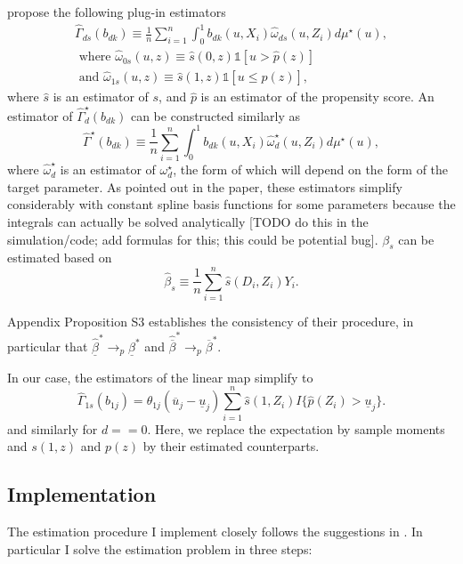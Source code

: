\documentclass[11pt, a4paper, leqno]{article}
\begin{document}
\citet{mogstad2018using} propose the following plug-in estimators
$$
\begin{gathered}
\hat{\Gamma}_{d s}\left(b_{d k}\right) \equiv \frac{1}{n} \sum_{i=1}^n \int_0^1 b_{d k}\left(u, X_i\right) \hat{\omega}_{d s}\left(u, Z_i\right) d \mu^{\star}(u), \\
\text { where } \hat{\omega}_{0 s}(u, z) \equiv \hat{s}(0, z) \mathbb{1}[u>\hat{p}(z)] \\
\text { and } \hat{\omega}_{1 s}(u, z) \equiv \hat{s}(1, z) \mathbb{1}[u \leq \hat{p}(z)],
\end{gathered}
$$
where $\hat{s}$ is an estimator of $s$, and $\hat{p}$ is an estimator of the propensity score. An estimator of $\hat{\Gamma}_d^{\star}\left(b_{d k}\right)$ can be constructed similarly as
$$
\hat{\Gamma}^{\star}\left(b_{d k}\right) \equiv \frac{1}{n} \sum_{i=1}^n \int_0^1 b_{d k}\left(u, X_i\right) \hat{\omega}_d^{\star}\left(u, Z_i\right) d \mu^{\star}(u),
$$
where $\hat{\omega}_d^{\star}$ is an estimator of $\omega_d^{\star}$, the form of which will depend on the form of the target parameter.
As pointed out in the paper, these estimators simplify considerably with constant spline basis functions for some parameters because the integrals can actually be solved analytically [TODO do this in the simulation/code; add formulas for this; this could be potential bug].
$\beta_s$ can be estimated based on
$$
\hat{\beta}_s \equiv \frac{1}{n} \sum_{i=1}^n \hat{s}\left(D_i, Z_i\right) Y_i.
$$

Appendix Proposition S3 establishes the consistency of their procedure, in particular that $\hat{\underline{\beta}}^*\to_p \underline{\beta}^*$ and $\hat{\overline{\beta}}^*\to_p\overline{\beta}^*$.

In our case, the estimators of the linear map simplify to
\begin{equation}
    \label{eq:est_weights_maps}
    \hat{\Gamma}_{1s}(b_{1j}) =\theta_{1j} (\overline{u}_j-\underline{u}_j)\sum_{i=1}^{n} \hat{s}(1,Z_i) I\{\hat{p}(Z_i)> \underline{u}_j\}.
\end{equation}
and similarly for $d==0$. Here, we replace the expectation by sample moments and $s(1,z)$ and $p(z)$ by their estimated counterparts.

\subsection{Implementation}
The estimation procedure I implement closely follows the suggestions in \citet{mogstad2018using}. In particular I solve the estimation problem in three steps:
\end{document}
